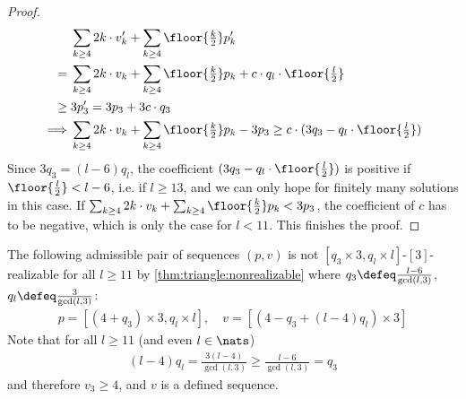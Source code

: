 \begin{theorem}
\begin{proof}
    \begin{align*}
      &\sum_{k \geq 4} 2k \cdot v'_k + \sum_{k \geq 4} \floor{\tfrac{k}{2}} p'_k \\
      ={}&\sum_{k \geq 4} 2k \cdot v_k + \sum_{k \geq 4} \floor{\tfrac{k}{2}} p_k + c \cdot q_l \cdot \floor{\tfrac{l}{2}}\\
      \geq{} & 3 p'_3 {}={} 3 p_3 + 3 c \cdot q_3 \\
      \implies & \sum_{k \geq 4} 2k \cdot v_k + \sum_{k \geq 4} \floor{\tfrac{k}{2}} p_k - 3p_3 \geq c \cdot (3 q_3 - q_l \cdot \floor{\tfrac{l}{2}})
    \end{align*}
    Since $3q_3 = (l - 6)q_l$, the coefficient $(3 q_3 - q_l \cdot \floor{\tfrac{l}{2}})$ is positive if $\floor{\frac{l}{2}} < l - 6$, i.e. if $l \geq 13$, and we can only hope for finitely many solutions in this case. If $\sum_{k \geq 4} 2k \cdot v_k + \sum_{k \geq 4} \floor{\tfrac{k}{2}} p_k < 3p_3$, the coefficient of $c$ has to be negative, which is only the case for $l < 11$. This finishes the proof.
  \end{proof}
\end{theorem}

\begin{example}
  The following admissible pair of sequences $(p, v)$ is not $[q_3 \times 3, q_l \times l]$-$[3]$-realizable for all $l \geq 11$ by \autoref{thm:triangle:nonrealizable} where $q_3 \defeq \tfrac{l - 6}{\gcd(l, 3)}$, $q_l \defeq \tfrac{3}{\gcd(l, 3)}$:
  \begin{align*}
    p = [(4 + q_3) \times 3, q_l \times l],\quad v = [(4 - q_3 + (l - 4)q_l) \times 3]
  \end{align*}
  Note that for all $l \geq 11$ (and even $l \in \nats$) 
  \begin{align*}
    (l - 4)q_l = \tfrac{3(l - 4)}{\gcd(l, 3)} \geq \tfrac{l - 6}{\gcd(l, 3)} = q_3
  \end{align*}
  and therefore $v_3 \geq 4$, and $v$ is a defined sequence.
\end{example}
